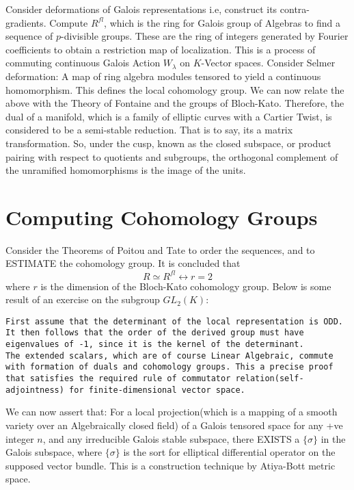 \documentclass[11pt,fancy]{elegantbook}
\begin{document}
Consider deformations of Galois representations i.e, construct its contra-gradients. 
Compute $R^{fl}$, which is the ring for Galois group of Algebras to find a sequence of $p$-divisible groups. These are the ring of integers generated by Fourier coefficients to obtain a restriction map of localization. This is a process of commuting continuous Galois Action ${W_\lambda}$ on $K$-Vector spaces.
Consider Selmer deformation: A map of ring algebra modules tensored to yield a continuous homomorphism. This defines the local cohomology group.
We can now relate the above with the Theory of Fontaine and the groups of Bloch-Kato. Therefore, the dual of a manifold, which is a family of elliptic curves with a Cartier Twist, is considered to be a semi-stable reduction. That is to say, its a matrix transformation.
So, under the cusp, known as the closed subspace, or product pairing with respect to quotients and subgroups, the orthogonal complement of the unramified homomorphisms is the image of the units.

\section{Computing Cohomology Groups}
Consider the Theorems of Poitou and Tate to order the sequences, and to ESTIMATE the cohomology group. It is concluded that 
\begin{equation}
    R \simeq {R^{fl}} \leftrightarrow r = 2
\end{equation}
 where $r$ is the dimension of the Bloch-Kato cohomology group. Below is some result of an exercise on the subgroup ${GL_2(K)}$:
\begin{lstlisting}
First assume that the determinant of the local representation is ODD. It then follows that the order of the derived group must have eigenvalues of -1, since it is the kernel of the determinant.
The extended scalars, which are of course Linear Algebraic, commute with formation of duals and cohomology groups. This a precise proof that satisfies the required rule of commutator relation(self-adjointness) for finite-dimensional vector space.
\end{lstlisting}

We can now assert that: For a local projection(which is a mapping of a smooth variety over an Algebraically closed field) of a Galois tensored space for any +ve integer $n$, and any irreducible Galois stable subspace, there EXISTS a $\{\sigma\}$ in the Galois subspace, where $\{\sigma\}$ is the sort for elliptical differential operator on the supposed vector bundle. This is a construction technique by Atiya-Bott metric space.
\end{document}
